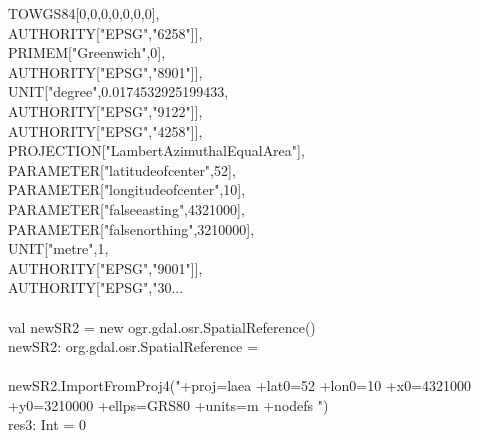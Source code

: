 \documentclass {article}
\begin{document}
\hspace*{6mm} TOWGS84[0,0,0,0,0,0,0],\\
\hspace*{8mm} AUTHORITY["EPSG","6258"]],\\
\hspace*{4mm} PRIMEM["Greenwich",0], \\
\hspace*{8mm} AUTHORITY["EPSG","8901"]], \\
\hspace*{4mm} UNIT["degree",0.0174532925199433,\\
\hspace*{8mm} AUTHORITY["EPSG","9122"]],\\
\hspace*{4mm} AUTHORITY["EPSG","4258"]],\\
\hspace*{2mm}PROJECTION["Lambert\underline{\space}Azimuthal\underline{\space}Equal\underline{\space}Area"],\\
\hspace*{2mm} PARAMETER["latitude\underline{\space}of\underline{\space}center",52],\\
\hspace*{2mm} PARAMETER["longitude\underline{\space}of\underline{\space}center",10],\\
\hspace*{2mm} PARAMETER["false\underline{\space}easting",4321000],\\
\hspace*{2mm} PARAMETER["false\underline{\space}northing",3210000],\\
\hspace*{2mm} UNIT["metre",1,\\
\hspace*{4mm} AUTHORITY["EPSG","9001"]],\\
\hspace*{2mm} AUTHORITY["EPSG","30...\\
\\
val newSR2 = new ogr.gdal.osr.SpatialReference() \\
newSR2: org.gdal.osr.SpatialReference = \\
\\
newSR2.ImportFromProj4("+proj=laea +lat\underline{\space}0=52 +lon\underline{\space}0=10 +x\underline{\space}0=4321000 +y\underline{\space}0=3210000 +ellps=GRS80 +units=m +no\underline{\space}defs ") \\
res3: Int = 0 \\
\end{document}
